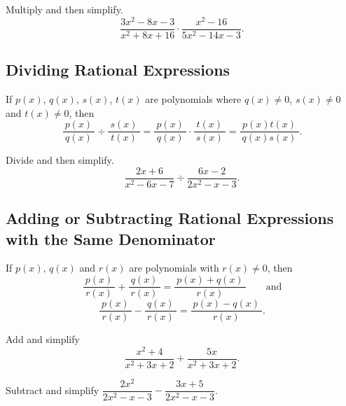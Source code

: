 \begin{example}
  Multiply and then simplify. \[
  \frac{3x^2-8x-3}{x^2+8x+16}\cdot\frac{x^2-16}{5x^2-14x-3}.
  \]
\end{example}
\vspace*{4\baselineskip}


\hypertarget{dividing-rational-expressions}{%
\subsection{Dividing Rational
Expressions}\label{dividing-rational-expressions}}

If \(p(x)\), \(q(x)\), \(s(x)\), \(t(x)\) are polynomials where \(q(x)\neq 0\),
\(s(x)\neq 0\) and \(t(x)\neq 0\), then \[
\frac{~p(x)~}{~q(x)~}\div\frac{~s(x)~}{~t(x)~}=\frac{~p(x)~}{~q(x)~}\cdot\frac{~t(x)~}{~s(x)~}=\frac{~p(x)t(x)~}{~q(x)s(x)~}.
\]

\begin{example}
  Divide and then simplify.\\
  \[
  \frac{2x+6}{x^2-6x-7}\div \frac{6x-2}{2x^2-x-3}.
  \]
\end{example}
\vspace*{4\baselineskip}

\hypertarget{adding-or-subtracting-rational-expressions-with-the-same-denominator}{%
\subsection{Adding or Subtracting Rational Expressions with the Same
Denominator}\label{adding-or-subtracting-rational-expressions-with-the-same-denominator}}

If \(p(x)\), \(q(x)\) and \(r(x)\) are polynomials with \(r(x)\neq 0\), then \[
\frac{~p(x)~}{~r(x)~}+\frac{~q(x)~}{~r(x)~}=\frac{~p(x)+q(x)~}{~r(x)~}\qquad \text{and}\]
\[
\frac{~p(x)~}{~r(x)~}-\frac{~q(x)~}{~r(x)~}=\frac{~p(x)-q(x)~}{~r(x)~}.
\]

\begin{example}
  Add and simplify\\
  \[
  \frac{x^2+4}{x^2+3x+2}+\frac{5x}{x^2+3x+2}.
  \]
\end{example}
\vspace*{4\baselineskip}

\begin{example}
  Subtract and simplify \(\dfrac{2x^2}{2x^2-x-3}-\dfrac{3x+5}{2x^2-x-3}\).
\end{example}
\vspace*{4\baselineskip}


